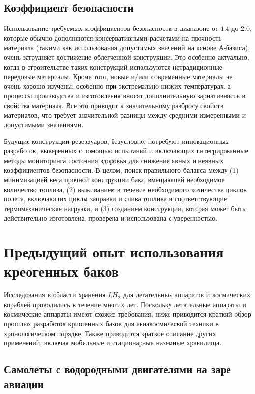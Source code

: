\subsection{Коэффициент безопасности}\label{ch:overview:1:sec2:sub5}

Использование требуемых коэффициентов безопасности в диапазоне от \(1.4\) до \(2.0\), которые обычно дополняются консервативными расчетами на прочность материала (такими как использования допустимых значений на основе А-базиса), очень затрудняет достижение облегченной конструкции. Это особенно актуально, когда в строительстве таких конструкций используются нетрадиционные передовые материалы. Кроме того, новые и/или современные материалы не очень хорошо изучены, особенно при экстремально низких температурах, а процессы производства и изготовления вносят дополнительную вариативность в свойства материала. Все это приводит к значительному разбросу свойств материалов, что требует значительной разницы между средними измеренными и допустимыми значениями.

Будущие конструкции резервуаров, безусловно, потребуют инновационных разработок, выверенных с помощью испытаний и включающих интегрированные методы мониторинга состояния здоровья для снижения явных и неявных коэффициентов безопасности.  В целом, поиск правильного баланса между (1) минимизацией веса прочной конструкции бака, вмещающей необходимое количество топлива, (2) выживанием в течение необходимого количества циклов полета, включающих циклы заправки и слива топлива и соответствующие термомеханические нагрузки, и (3) созданием конструкции, которая может быть действительно изготовлена, проверена и использована с уверенностью.


\section{Предыдущий опыт использования креогенных баков}\label{ch:overview:1:sec3}

Исследования в области хранения \(LH_2\) для летательных аппаратов и космических кораблей проводились в течение многих лет. Поскольку летательные аппараты и космические аппараты имеют схожие требования, ниже приводится краткий обзор прошлых разработок криогенных баков для авиакосмической техники в хронологическом порядке. Также приводится краткое описание других применений, включая мобильные и стационарные наземные хранилища. 

\subsection{Самолеты с водородными двигателями на заре авиации}\label{ch:overview:1:sec3:sub1}

